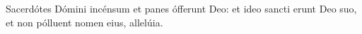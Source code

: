 Sacerdótes Dómini incénsum et panes ófferunt Deo: et ideo sancti erunt Deo suo, et non pólluent nomen eius, allelúia.
